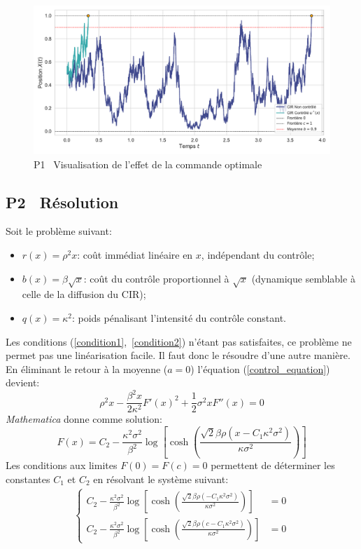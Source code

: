 \begin{figure}[htb]
    \centering
    \includegraphics[width=0.9\linewidth]{img/validation/P1/p1_control_simulation.pdf}
    \caption{P1 \textemdash~Visualisation de l'effet de la commande optimale}\label{fig:Simulation1}
\end{figure}\FloatBarrier\pagebreak\subsection{P2 \textemdash~Résolution}\label{p2}
Soit le problème suivant:
\begin{itemize}
    \item $r(x) = \rho^2x$: coût immédiat linéaire en $x$, indépendant du contrôle;
    \item $b(x) = \beta\sqrt{x}$: coût du contrôle proportionnel à $\sqrt{x}$ (dynamique semblable à celle de la diffusion du \acs{CIR});
    \item $q(x) = \kappa^2$: poids pénalisant l'intensité du contrôle constant.
\end{itemize}
Les conditions (\ref{condition1},~\ref{condition2}) n'étant pas satisfaites, ce problème ne permet pas une linéarisation facile. Il faut donc le résoudre d'une autre manière. En éliminant le retour à la moyenne ($a=0$) l'équation (\ref{control_equation}) devient:
\[
\rho^2x-\frac{\beta^2x}{2\kappa^2}{F'(x)}^2+\frac{1}{2}\sigma^2xF''(x)=0
\]
\textit{Mathematica} donne comme solution:
\begin{equation}
    F(x)=C_2-\frac{\kappa ^2 \sigma ^2 }{\beta ^2}\log \left[\cosh \left(\frac{\sqrt{2} \beta  \rho  \left(x-C_1 \kappa ^2 \sigma ^2\right)}{\kappa  \sigma ^2}\right)\right]
\end{equation}
Les conditions aux limites $F(0)=F(c)=0$ permettent de déterminer les constantes $C_1$ et $C_2$ en résolvant le système suivant:
\begin{align*}
\left\{\begin{aligned}
    C_2-\frac{\kappa ^2 \sigma ^2 }{\beta ^2}\log \left[\cosh \left(\frac{\sqrt{2} \beta  \rho  \left(-C_1 \kappa ^2 \sigma ^2\right)}{\kappa  \sigma ^2}\right)\right]&=0\\
    C_2-\frac{\kappa ^2 \sigma ^2 }{\beta ^2}\log \left[\cosh \left(\frac{\sqrt{2} \beta  \rho  \left(c-C_1 \kappa ^2 \sigma ^2\right)}{\kappa  \sigma ^2}\right)\right]&=0
\end{aligned}\right.
\end{align*}
